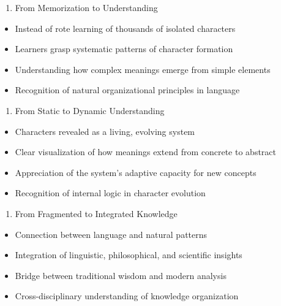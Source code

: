 \begin{enumerate}
\def\labelenumi{\arabic{enumi}.}
\tightlist
\item
  From Memorization to Understanding
\end{enumerate}

\begin{itemize}
\tightlist
\item
  Instead of rote learning of thousands of isolated characters
\item
  Learners grasp systematic patterns of character formation
\item
  Understanding how complex meanings emerge from simple elements
\item
  Recognition of natural organizational principles in language
\end{itemize}

\begin{enumerate}
\def\labelenumi{\arabic{enumi}.}
\setcounter{enumi}{1}
\tightlist
\item
  From Static to Dynamic Understanding
\end{enumerate}

\begin{itemize}
\tightlist
\item
  Characters revealed as a living, evolving system
\item
  Clear visualization of how meanings extend from concrete to abstract
\item
  Appreciation of the system's adaptive capacity for new concepts
\item
  Recognition of internal logic in character evolution
\end{itemize}

\begin{enumerate}
\def\labelenumi{\arabic{enumi}.}
\setcounter{enumi}{2}
\tightlist
\item
  From Fragmented to Integrated Knowledge
\end{enumerate}

\begin{itemize}
\tightlist
\item
  Connection between language and natural patterns
\item
  Integration of linguistic, philosophical, and scientific insights
\item
  Bridge between traditional wisdom and modern analysis
\item
  Cross-disciplinary understanding of knowledge organization
\end{itemize}

